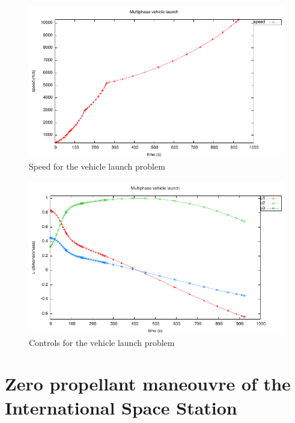 \documentclass[a4paper,11pt]{report}    %
\begin{document}
\begin{figure}
  \centering 
  \includegraphics{../examples/launch/launch_speed}
  \caption{Speed for the vehicle launch problem}
 \label{fig:launch_speed}
\end{figure}


\begin{figure}
  \centering
  \includegraphics{../examples/launch/launch_control}
  \caption{Controls for the vehicle launch problem}
 \label{fig:launch_control}
\end{figure}


\section{Zero propellant maneouvre of the International Space Station}
\end{document}

